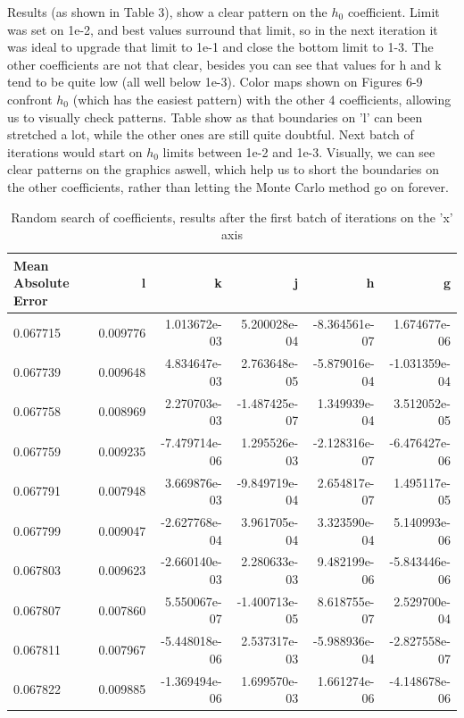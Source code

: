 \documentclass[openany]{article}
\begin{document}
\newpage 


Results (as shown in Table 3), show a clear pattern on the \(h_0\) coefficient. Limit was set on 1e-2, and best values surround that limit, so in the next iteration it was ideal to upgrade that limit to 1e-1 and close the bottom limit to 1-3. The other coefficients are not that clear, besides you can see that values for h and k tend to be quite low (all well below 1e-3). Color maps shown on Figures 6-9 confront \(h_0\) (which has the easiest pattern) with the other 4 coefficients, allowing us to visually check patterns. Table show as that boundaries on 'l' can been stretched a lot, while the other ones are still quite doubtful. Next batch of iterations would start on \(h_0\) limits between 1e-2 and 1e-3. Visually, we can see clear patterns on the graphics aswell, which help us to short the boundaries on the other coefficients, rather than letting the Monte Carlo method go on forever.


\begin{table}[!h]
    \centering
\begin{tabular}{lrrrrr}
\toprule
Mean Absolute Error &         l &             k &             j &             h &             g \\
\hline
\hline
\midrule
0.067715 &  0.009776 &  1.013672e-03 &  5.200028e-04 & -8.364561e-07 &  1.674677e-06 \\
0.067739 &  0.009648 &  4.834647e-03 &  2.763648e-05 & -5.879016e-04 & -1.031359e-04 \\
0.067758 &  0.008969 &  2.270703e-03 & -1.487425e-07 &  1.349939e-04 &  3.512052e-05 \\
0.067759 &  0.009235 & -7.479714e-06 &  1.295526e-03 & -2.128316e-07 & -6.476427e-06 \\
0.067791 &  0.007948 &  3.669876e-03 & -9.849719e-04 &  2.654817e-07 &  1.495117e-05 \\
0.067799 &  0.009047 & -2.627768e-04 &  3.961705e-04 &  3.323590e-04 &  5.140993e-06 \\
0.067803 &  0.009623 & -2.660140e-03 &  2.280633e-03 &  9.482199e-06 & -5.843446e-06 \\
0.067807 &  0.007860 &  5.550067e-07 & -1.400713e-05 &  8.618755e-07 &  2.529700e-04 \\
0.067811 &  0.007967 & -5.448018e-06 &  2.537317e-03 & -5.988936e-04 & -2.827558e-07 \\
0.067822 &  0.009885 & -1.369494e-06 &  1.699570e-03 &  1.661274e-06 & -4.148678e-06 \\
\hline
\hline

\bottomrule
\end{tabular}
\caption{Random search of coefficients, results after the first batch of iterations on the 'x' axis}
    \label{tab:my_label}
\end{table} \\
\end{document}
